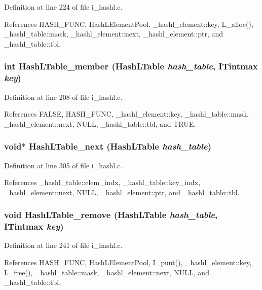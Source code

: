 Definition at line 224 of file i\_\-hashl.c.

References HASH\_\-FUNC, Hash\-LElement\-Pool, \_\-hashl\_\-element::key, L\_\-alloc(), \_\-hashl\_\-table::mask, \_\-hashl\_\-element::next, \_\-hashl\_\-element::ptr, and \_\-hashl\_\-table::tbl.
\subsubsection{\setlength{\rightskip}{0pt plus 5cm}int Hash\-LTable\_\-member (\bf{Hash\-LTable} {\em hash\_\-table}, \bf{ITintmax} {\em key})}\label{i__hashl_8h_d2d8da0ea7677017ae986d4c67307cd6}




Definition at line 208 of file i\_\-hashl.c.

References FALSE, HASH\_\-FUNC, \_\-hashl\_\-element::key, \_\-hashl\_\-table::mask, \_\-hashl\_\-element::next, NULL, \_\-hashl\_\-table::tbl, and TRUE.
\subsubsection{\setlength{\rightskip}{0pt plus 5cm}void$\ast$ Hash\-LTable\_\-next (\bf{Hash\-LTable} {\em hash\_\-table})}\label{i__hashl_8h_bac3bf6b2ac8b3d49c7e0151112ff2bc}




Definition at line 305 of file i\_\-hashl.c.

References \_\-hashl\_\-table::elem\_\-indx, \_\-hashl\_\-table::key\_\-indx, \_\-hashl\_\-element::next, NULL, \_\-hashl\_\-element::ptr, and \_\-hashl\_\-table::tbl.
\subsubsection{\setlength{\rightskip}{0pt plus 5cm}void Hash\-LTable\_\-remove (\bf{Hash\-LTable} {\em hash\_\-table}, \bf{ITintmax} {\em key})}\label{i__hashl_8h_a22d76051a8c344af928018cb1905877}




Definition at line 241 of file i\_\-hashl.c.

References HASH\_\-FUNC, Hash\-LElement\-Pool, I\_\-punt(), \_\-hashl\_\-element::key, L\_\-free(), \_\-hashl\_\-table::mask, \_\-hashl\_\-element::next, NULL, and \_\-hashl\_\-table::tbl.
